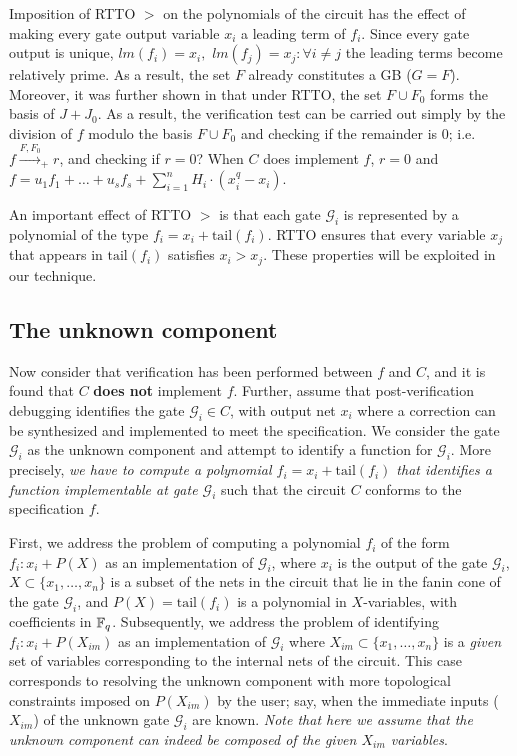 Imposition of RTTO $>$ on the polynomials of the circuit has the
effect of making every gate output variable $x_i$ a leading term of
$f_i$. Since every gate output is unique, $lm(f_i)=x_i,$ $lm(f_j)=x_j
:\forall i\neq j$ the leading terms become relatively prime. As a result, the set $F$ 
already constitutes a GB ($G=F$). Moreover, it was further shown in
\cite{lv:tcad2013} that under RTTO, the set $F \cup F_0$ forms the
\Grobner basis of $J + J_0$. As a result, the verification test
can be carried out simply by the division of $f$ modulo the \Grobner
basis $F\cup F_0$ and checking if the remainder is 0; i.e. $f
\xrightarrow{F,F_0}_+r$, and checking if $r = 0$? When $C$ does
implement $f$, $r=0$ and $f = u_1f_1+\dots+u_sf_s + \sum_{i=1}^n
H_i\cdot(x_i^q-x_i)$. 

An important effect of RTTO $>$ is that each gate $\mathcal{G}_i$ is
represented by a polynomial of the type $f_i = x_i +
\text{tail}(f_i)$.  RTTO ensures that
every variable $x_j$ that appears in $\text{tail}(f_i)$ satisfies
$x_i>x_j$. These properties will be exploited in our technique. 

\subsection{The unknown component}
Now consider that verification has been performed between $f$ and $C$,
and it is found that $C$ {\bf does not} implement $f$. Further, assume
that post-verification debugging identifies the gate $\mathcal{G}_i
\in C$, with output net $x_i$ where a correction can be synthesized and
implemented to meet the specification. We consider the gate
$\mathcal{G}_i$ as the unknown component and attempt to identify a
function for $\mathcal{G}_i$. More precisely, {\it we have to compute
  a polynomial $f_i = x_i + \text{tail}(f_i)$ that identifies a
  function implementable at gate $\mathcal{G}_i$} such that the
circuit $C$ conforms to the specification $f$. 

First, we address the problem of computing a polynomial
$f_i$ of the form $f_i:x_i+P(X)$ as an implementation of
$\mathcal{G}_i$, where $x_i$ is the output of the gate
$\mathcal{G}_i$, $X \subset \{x_1,\dots,x_n\}$ is a subset of the nets
in the circuit that lie in the fanin cone of the gate $\mathcal{G}_i$,
and $P(X) = \text{tail}(f_i)$ is a polynomial in $X$-variables,
with coefficients in ${\mathbb{F}}_{q}$. Subsequently, we address the problem of
identifying $f_i:x_i+P(X_{im})$ as an implementation of
$\mathcal{G}_i$ where  $X_{im} \subset \{x_1,\dots,x_n\}$ is a {\it
  given} set of variables corresponding to the internal nets of the
circuit. This case corresponds to resolving the unknown component with
more topological constraints imposed on $P(X_{im})$ by the user; say,
when the immediate inputs ($X_{im}$) of the unknown gate
$\mathcal{G}_i$ are known.  {\it Note that here we assume that the
  unknown component can indeed be composed of the given $X_{im}$
  variables}. 


